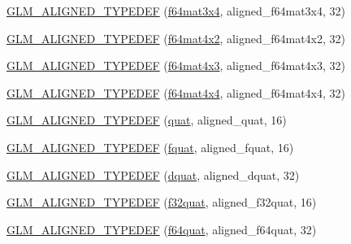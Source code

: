 \begin{DoxyCompactItemize}
\item 
\hyperlink{group__gtx__type__aligned_ga5875e0fa72f07e271e7931811cbbf31a}{G\+L\+M\+\_\+\+A\+L\+I\+G\+N\+E\+D\+\_\+\+T\+Y\+P\+E\+D\+E\+F} (\hyperlink{group__gtc__type__precision_ga36436dae85fc187d4a20d68c4d660a10}{f64mat3x4}, aligned\+\_\+f64mat3x4, 32)
\item 
\hyperlink{group__gtx__type__aligned_ga41e82cd6ac07f912ba2a2d45799dcf0d}{G\+L\+M\+\_\+\+A\+L\+I\+G\+N\+E\+D\+\_\+\+T\+Y\+P\+E\+D\+E\+F} (\hyperlink{group__gtc__type__precision_ga13dbaf75e4f1b18c35d2837067a14ce9}{f64mat4x2}, aligned\+\_\+f64mat4x2, 32)
\item 
\hyperlink{group__gtx__type__aligned_ga0892638d6ba773043b3d63d1d092622e}{G\+L\+M\+\_\+\+A\+L\+I\+G\+N\+E\+D\+\_\+\+T\+Y\+P\+E\+D\+E\+F} (\hyperlink{group__gtc__type__precision_gab10a195a85f65da47bf70438f57a8a3c}{f64mat4x3}, aligned\+\_\+f64mat4x3, 32)
\item 
\hyperlink{group__gtx__type__aligned_ga912a16432608b822f1e13607529934c1}{G\+L\+M\+\_\+\+A\+L\+I\+G\+N\+E\+D\+\_\+\+T\+Y\+P\+E\+D\+E\+F} (\hyperlink{group__gtc__type__precision_ga6b1ada50de2fc7d991138ab857fb2476}{f64mat4x4}, aligned\+\_\+f64mat4x4, 32)
\item 
\hyperlink{group__gtx__type__aligned_gafd945a8ea86b042aba410e0560df9a3d}{G\+L\+M\+\_\+\+A\+L\+I\+G\+N\+E\+D\+\_\+\+T\+Y\+P\+E\+D\+E\+F} (\hyperlink{namespaceglm_ac1f6a5957091b849730ea6f05a6b7ad6}{quat}, aligned\+\_\+quat, 16)
\item 
\hyperlink{group__gtx__type__aligned_gad8c4bfacff70e57dc8303634c8bfce35}{G\+L\+M\+\_\+\+A\+L\+I\+G\+N\+E\+D\+\_\+\+T\+Y\+P\+E\+D\+E\+F} (\hyperlink{namespaceglm_aa95d73f08018f3864c6ae08dbf1c59f2}{fquat}, aligned\+\_\+fquat, 16)
\item 
\hyperlink{group__gtx__type__aligned_gaabc28c84a3288b697605d4688686f9a9}{G\+L\+M\+\_\+\+A\+L\+I\+G\+N\+E\+D\+\_\+\+T\+Y\+P\+E\+D\+E\+F} (\hyperlink{namespaceglm_a49693161673a003b4a8fd4d8b15b0b7b}{dquat}, aligned\+\_\+dquat, 32)
\item 
\hyperlink{group__gtx__type__aligned_ga1ed8aeb5ca67fade269a46105f1bf273}{G\+L\+M\+\_\+\+A\+L\+I\+G\+N\+E\+D\+\_\+\+T\+Y\+P\+E\+D\+E\+F} (\hyperlink{group__gtc__type__precision_gac59c4d798396552e4bbb866b3d8a2f18}{f32quat}, aligned\+\_\+f32quat, 16)
\item 
\hyperlink{group__gtx__type__aligned_ga95cc03b8b475993fa50e05e38e203303}{G\+L\+M\+\_\+\+A\+L\+I\+G\+N\+E\+D\+\_\+\+T\+Y\+P\+E\+D\+E\+F} (\hyperlink{group__gtc__type__precision_ga5b54d7b36fbee5e271f73e6ed74e7172}{f64quat}, aligned\+\_\+f64quat, 32)

\end{DoxyCompactItemize}
